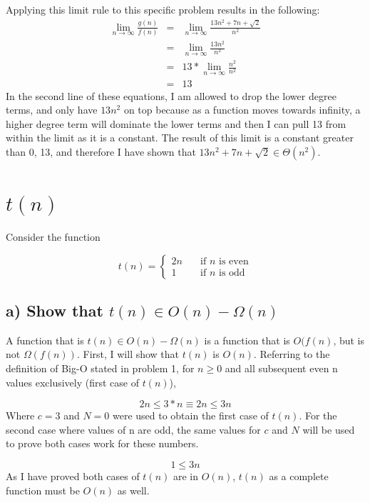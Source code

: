 \documentclass[11pt]{article}
\begin{document}
Applying this limit rule to this specific problem results in the following:
\begin{eqnarray*}
\lim\limits_{n \to \infty} \frac{g(n)}{f(n)} &=& \lim\limits_{n \to \infty} \frac{13n^2+7n+\sqrt2}{n^2} \\
&=& \lim\limits_{n \to \infty} \frac{13n^2}{n^2} \\
&=& 13 * \lim\limits_{n \to \infty} \frac{n^2}{n^2} \\
&=& 13
\end{eqnarray*}
In the second line of these equations, I am allowed to drop the lower degree terms, and only have $13n^2$ on top because as a function moves towards infinity, a higher degree term will dominate the lower terms and then I can pull 13 from within the limit as it is a constant. The result of this limit is a constant greater than 0, 13, and therefore I have shown that $13n^2+7n+\sqrt2 \in \Theta (n^2)$.


\section{$t(n)$}
Consider the function

\[ t(n) =
  \begin{cases}
    2n       & \quad \text{if } n \text{ is even}\\
    1  & \quad \text{if } n \text{ is odd}
  \end{cases}
\]

\subsection*{a) Show that $t(n) \in O(n) - \Omega(n)$}
A function that is $t(n) \in O(n) - \Omega(n)$ is a function that is $O(f(n)$, but is not $\Omega (f(n))$. First, I will show that $t(n)$ is $O(n)$. Referring to the definition of Big-O stated in problem 1, for $n \geq 0$ and all subsequent even n values exclusively (first case of $t(n)$),

\begin{equation*}
2n \leq 3*n \equiv 2n \leq 3n
\end{equation*}
Where $c=3$ and $N=0$ were used to obtain the first case of $t(n)$. For the second case where values of n are odd, the same values for $c$ and $N$ will be used to prove both cases work for these numbers.

\begin{equation*}
1 \leq 3n
\end{equation*}
As I have proved both cases of $t(n)$ are in $O(n)$, $t(n)$ as a complete function must be $O(n)$ as well.
\end{document}
